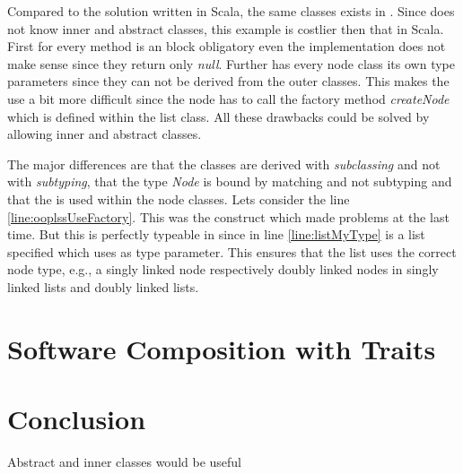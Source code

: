 Compared to the solution written in Scala, the same classes exists
in \ooplss. Since \ooplss does not know inner and abstract classes,
this example is costlier then that in Scala. First for every method is
an block obligatory even the implementation does not make sense since
they return only \emph{null}. Further has every node class its own type
parameters since they can not be derived from the outer classes. This
makes the use a bit more difficult since the node has to call the factory
method \emph{createNode} which is defined within the list class. All
these drawbacks could be solved by allowing inner and abstract classes.

The major differences are that the classes are derived with
\emph{subclassing} and not with \emph{subtyping}, that the type
\emph{Node} is bound by matching and not subtyping and that the
\mytype is used within the node classes. Lets consider the line
\ref{line:ooplssUseFactory}. This was the construct which made problems
at the last time. But this is perfectly typeable in \ooplss since in
line \ref{line:listMyType} is a list specified which uses \mytype as
type parameter. This ensures that the list uses the correct node type,
e.g., a singly linked node respectively doubly linked nodes in singly
linked lists and doubly linked lists.



\section{Software Composition with Traits}

\section{Conclusion}

Abstract and inner classes would be useful
